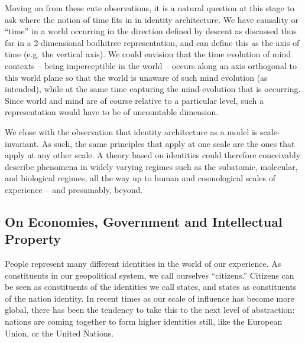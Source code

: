 \documentclass[pra,twocolumn,groupedaddress,10pt]{revtex4}
\theoremstyle{definition}
\begin{document}

Moving on from these cute observations, it is a natural question at this stage to ask where the notion of time fits in in identity architecture. We have causality or ``time'' in a world occurring in the direction defined by descent as discussed thus far in a 2-dimensional bodhitree representation, and can define this as the axis of time (e.g. the vertical axis). We could envision that the time evolution of mind contexts -- being imperceptible in the world -- occurs along an axis orthogonal to this world plane so that the world is unaware of such mind evolution (as intended), while at the same time capturing the mind-evolution that is occurring. Since world and mind are of course relative to a particular level, such a representation would have to be of uncountable dimension.

We close with the observation that identity architecture as a model is scale-invariant. As such, the same principles that apply at one scale are the ones that apply at any other scale. A theory based on identities could therefore conceivably describe phenomena in widely varying regimes such as the subatomic, molecular, and biological regimes, all the way up to human and cosmological scales of experience -- and presumably, beyond. %


\subsection{On Economies, Government and Intellectual Property} \label{sec:ecogovintpro}

People represent many different identities in the world of our experience. As constituents in our geopolitical system, we call ourselves ``citizens.'' Citizens can be seen as constituents of the identities we call states, and states as constituents of the nation identity. In recent times as our scale of influence has become more global, there has been the tendency to take this to the next level of abstraction: nations are coming together to form higher identities still, like the European Union, or the United Nations.
\end{document}
